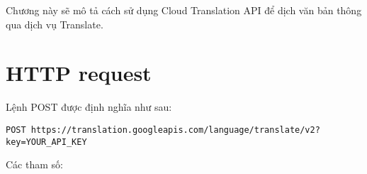 \documentclass[../thesis.tex]{subfiles}
\begin{document}
Chương này sẽ mô tả cách sử dụng Cloud Translation API để dịch văn bản thông qua dịch vụ Translate.

% 

% 
% 
% 
% 

\section{HTTP request}

Lệnh POST được định nghĩa như sau:

\begin{lstlisting}[numbers=none, frame=single,xleftmargin=0.15cm,xrightmargin=0.15cm]
POST https://translation.googleapis.com/language/translate/v2?key=YOUR_API_KEY
\end{lstlisting}

Các tham số:
\end{document}
